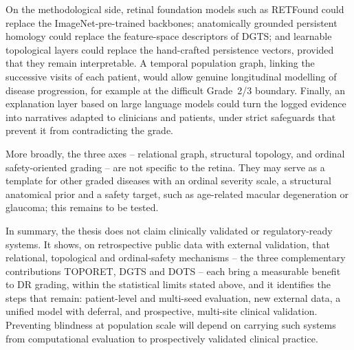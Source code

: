 On the methodological side, retinal foundation models such as RETFound could replace the
ImageNet-pre-trained backbones; anatomically grounded persistent homology could replace
the feature-space descriptors of DGTS; and learnable topological layers could replace the
hand-crafted persistence vectors, provided that they remain interpretable. A temporal
population graph, linking the successive visits of each patient, would allow genuine
longitudinal modelling of disease progression, for example at the difficult Grade~2/3
boundary. Finally, an explanation layer based on large language models could turn the
logged evidence into narratives adapted to clinicians and patients, under strict
safeguards that prevent it from contradicting the grade.

More broadly, the three axes -- relational graph, structural topology, and ordinal
safety-oriented grading -- are not specific to the retina. They may serve as a template for
other graded diseases with an ordinal severity scale, a structural anatomical prior and a
safety target, such as age-related macular degeneration or glaucoma; this remains to be
tested.

In summary, the thesis does not claim clinically validated or regulatory-ready systems. It
shows, on retrospective public data with external validation, that relational, topological
and ordinal-safety mechanisms -- the three complementary contributions TOPORET, DGTS and
DOTS -- each bring a measurable benefit to DR grading, within the statistical limits stated
above, and it identifies the steps that remain: patient-level and multi-seed evaluation,
new external data, a unified model with deferral, and prospective, multi-site clinical
validation.
Preventing blindness at population scale will depend on carrying such systems from
computational evaluation to prospectively validated clinical practice.
